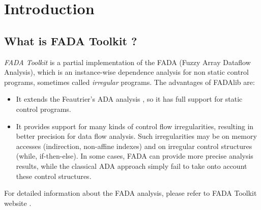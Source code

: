 \section{Introduction}

\subsection{What is FADA Toolkit ?}
 {\it FADA Toolkit} is a partial implementation of the FADA (Fuzzy Array Dataflow Analysis), which is an instance-wise dependence analysis for non static control programs, sometimes called {\it irregular} programs. The advantages of FADAlib are:

\begin{itemize}
    \item It extends the Feautrier's ADA analysis \cite{ada_feautrier}, so it has full support for static control programs.
    \item It provides support for many kinds of control flow irregularities, resulting in better precision for data flow analysis. Such irregularities may be on memory accesses (indirection, non-affine indexes) and on irregular control structures (while, if-then-else). In some cases, FADA can provide more precise analysis results, while the classical ADA approach simply fail to take onto account these control structures.
\end{itemize}

For detailed information about the FADA analysis, please refer to FADA Toolkit website \cite{fadalib_website}.

